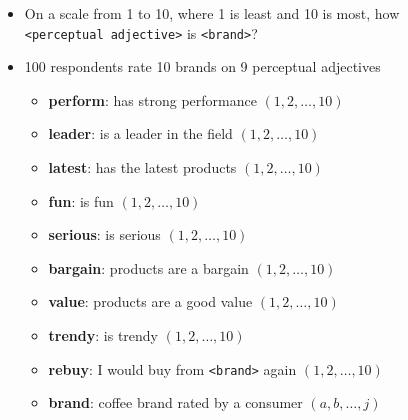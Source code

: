 \documentclass[
  ignorenonframetext,
]{beamer}
\providecommand{\tightlist}{%
  \setlength{\itemsep}{0pt}\setlength{\parskip}{0pt}}\usepackage{longtable,booktabs,array}
\begin{document}
\begin{frame}[fragile]{}
\label{section-2}
\begin{itemize}
\item
  On a scale from 1 to 10, where 1 is least and 10 is most, how
  \texttt{\textless{}perceptual\ adjective\textgreater{}} is
  \texttt{\textless{}brand\textgreater{}}?
\item
  100 respondents rate 10 brands on 9 perceptual adjectives

  \begin{itemize}
  \tightlist
  \item
    \textbf{perform}: has strong performance \((1, 2, \ldots, 10)\)
  \item
    \textbf{leader}: is a leader in the field \((1, 2, \ldots, 10)\)
  \item
    \textbf{latest}: has the latest products \((1, 2, \ldots, 10)\)
  \item
    \textbf{fun}: is fun \((1, 2, \ldots, 10)\)
  \item
    \textbf{serious}: is serious \((1, 2, \ldots, 10)\)
  \item
    \textbf{bargain}: products are a bargain \((1, 2, \ldots, 10)\)
  \item
    \textbf{value}: products are a good value \((1, 2, \ldots, 10)\)
  \item
    \textbf{trendy}: is trendy \((1, 2, \ldots, 10)\)
  \item
    \textbf{rebuy}: I would buy from
    \texttt{\textless{}brand\textgreater{}} again \((1, 2, \ldots, 10)\)
  \item
    \textbf{brand}: coffee brand rated by a consumer
    \((a, b, \ldots, j)\)
  \end{itemize}
\end{itemize}
\end{frame}
\end{document}
